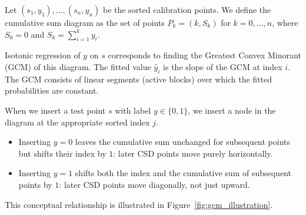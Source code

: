 \documentclass[11pt]{article}
\begin{document}
	Let $(s_1, y_1), \dots, (s_n, y_n)$ be the sorted calibration points. We define the cumulative sum diagram as the set of points $P_k = (k, S_k)$ for $k = 0, \dots, n$, where $S_0 = 0$ and $S_k = \sum_{i=1}^k y_i$. 
	
	Isotonic regression of $y$ on $s$ corresponds to finding the Greatest Convex Minorant (GCM) of this diagram. The fitted value $\hat{y}_i$ is the slope of the GCM at index $i$. The GCM consists of linear segments (active blocks) over which the fitted probabilities are constant.
	
	When we insert a test point $s$ with label $y \in \{0, 1\}$, we insert a node in the diagram at the appropriate sorted index $j$.
	\begin{itemize}
		\item Inserting $y = 0$ leaves the cumulative sum unchanged for subsequent points but shifts their index by $1$: later CSD points move purely horizontally.
		\item Inserting $y = 1$ shifts both the index and the cumulative sum of subsequent points by $1$: later CSD points move diagonally, not just upward.
	\end{itemize}
	This conceptual relationship is illustrated in Figure~\ref{fig:gcm_illustration}.
	
\end{document}
